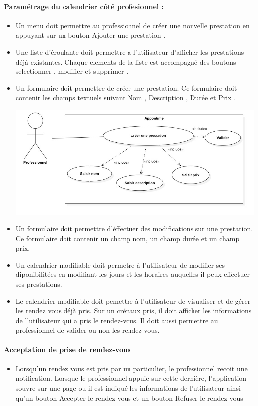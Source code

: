 \documentclass{article}
\begin{document}
\paragraph{Paramétrage du calendrier côté profesionnel :}
\begin{itemize}
\item Un menu doit permettre au professionnel de créer une nouvelle
  prestation en appuyant sur un bouton \og Ajouter une prestation
  \fg{}.
\item Une liste d'éroulante doit permettre à l'utilisateur d'afficher
  les prestations déjà existantes. Chaque elements de la liste est
  accompagné des boutons \og selectionner \fg{}, \og modifier \fg{} et
  \og supprimer \fg{}.

\item Un formulaire doit permettre de créer une prestation. Ce
  formulaire doit contenir les champs textuels suivant \og Nom \fg{}, \og Description
 \fg{},  \og Durée \fg{} et \og Prix \fg{}.

\includegraphics[scale=0.5]{ShematDiagrammes/useCaseCreerPrestation.jpg}

\item Un formulaire doit permettre d'éffectuer des modifications sur
  une prestation. Ce formulaire doit contenir un champ nom, un champ
  durée et un champ prix.
\item Un calendrier modifiable doit permetre à l'utilisateur de
  modifier ses diponibilitées en modifiant les jours et les horaires
  auquelles il peux effectuer ses prestations.
\item Le calendrier modifiable doit pemettre à l'utilisateur de
  visualiser et de gérer les rendez vous déjà pris. Sur un crénaux
  pris, il doit afficher les informations de l'utilisateur qui a pris
  le rendez-vous. Il doit aussi permettre au professionnel de valider
  ou non les rendez vous.
\end{itemize}

\paragraph{Acceptation de prise de rendez-vous}
\begin{itemize}
\item Lorsqu'un rendez vous est pris par un particulier, le
  professionnel recoit une notification. Lorsque le professionnel
  appuie sur cette dernière, l'application souvre sur une page ou il
  est indiqué les informations de l'utilisateur ainsi qu'un bouton \og
  Accepter le rendez vous \fg{} et un bouton \og
  Refuser le rendez vous \fg{}
\end{itemize}
\end{document}
